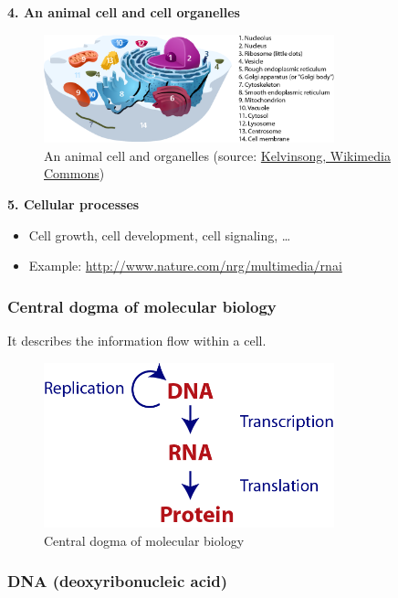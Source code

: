 \noindent \textbf{4. An animal cell and cell organelles}
\begin{figure}[H]
  \centering
      \includegraphics[width=0.75\textwidth]{fig01/animal_cells_and_organelles.png}
  \caption{An animal cell and organelles (source: \href{https://en.wikipedia.org/wiki/Organelle\#/media/File:Animal_Cell.svg}{Kelvinsong, Wikimedia Commons})}
\end{figure}

\noindent \textbf{5. Cellular processes}
\begin{itemize}
\item Cell growth, cell development, cell signaling, …
\item Example: \url{http://www.nature.com/nrg/multimedia/rnai}
\end{itemize}

%
%
\subsubsection*{Central dogma of molecular biology}

It describes the information flow within a cell.

\begin{figure}[H]
  \centering
      \includegraphics[width=0.75\textwidth]{fig01/central_dogma_of_molecular_biology.png}
  \caption{Central dogma of molecular biology}
\end{figure}

%
%
\subsubsection*{DNA (deoxyribonucleic acid)}

